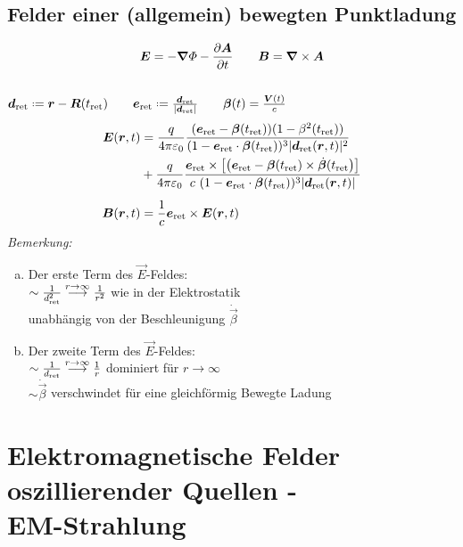 \subsection{Felder einer (allgemein) bewegten Punktladung}

\begin{equation*}
\bm{E} = - \bm{\nabla} \varPhi - \frac{\partial \bm{A}}{\partial t} \qquad \bm{B} = \bm{\nabla} \times \bm{A}
\end{equation*}
\\[5pt]
%
%
%
%
%
%
$ \vec{d}_{\tx{ret}} \defeq \vec{r} - \vec{R}(t_{\tx{ret}}) \qquad \vec{e}_{\tx{ret}} \defeq \frac{\vec{d}_{\tx{ret}}}{|\vec{d}_{\tx{ret}}|} \qquad \vec{\beta}(t) = \frac{\vec{V}(t)}{c} $
\begin{align*}
\bm{E}(\bm{r},t) &= \frac{q}{4 \pi \varepsilon_0} \frac{(\bm{e}_{\textrm{ret}} - \bm{\beta}(t_{\textrm{ret}})) ( 1 - \beta^2 (t_{\textrm{ret}}) )}{(1 - \bm{e}_{\textrm{ret}} \cdot \bm{\beta}(t_{\textrm{ret}}))^3 |\bm{d}_{\textrm{ret}}(\bm{r},t)|^2}\\
&+ \frac{q}{4 \pi \varepsilon_0} \frac{\bm{e}_{\textrm{ret}} \times \left[\left(\bm{e}_{\textrm{ret}} - \bm{\beta}(t_{\textrm{ret}}) \times \dot{\bm{\beta}}(t_{\textrm{ret}}\right)\right]}{c \ ( 1 - \bm{e}_{\textrm{ret}} \cdot \bm{\beta}(t_{\textrm{ret}}))^3 |\bm{d}_{\textrm{ret}}(\bm{r},t)|}\\[5pt]
\bm{B}(\bm{r},t) &= \frac{1}{c} \bm{e}_{\textrm{ret}} \times \bm{E}(\bm{r},t)
\end{align*}
\emph{Bemerkung:}
\begin{enumerate}[a)]
	\item Der erste Term des $ \vec{E} $-Feldes:\\
	$ \sim \frac{1}{d_{\textrm{ret}}^2} \overset{r \to \infty}{\longrightarrow} \frac{1}{r^2} $ wie in der Elektrostatik\\
	unabhängig von der Beschleunigung $ \dot{\vec{\beta}} $
	\item Der zweite Term des $ \vec{E} $-Feldes:\\
	$ \sim \frac{1}{d_{\textrm{ret}}} \overset{r \to \infty}{\longrightarrow} \frac{1}{r} $ dominiert für $ r \to \infty $\\[5pt]
	$ \sim \dot{\vec{\beta}} $ verschwindet für eine gleichförmig Bewegte Ladung
\end{enumerate}


\section{Elektromagnetische Felder oszillierender Quellen - \texorpdfstring{\\}{newline} EM-Strahlung}

